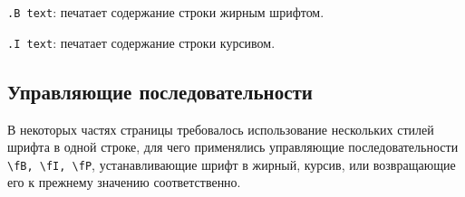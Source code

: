 \documentclass[listings]{labreport}
\begin{document}
\texttt{.B text}: печатает содержание строки жирным шрифтом.

\texttt{.I text}: печатает содержание строки курсивом.

\subsection*{Управляющие последовательности}

В некоторых частях страницы требовалось использование нескольких стилей шрифта в одной строке, для чего применялись
управляющие последовательности \texttt{\textbackslash fB, \textbackslash fI, \textbackslash fP},
устанавливающие шрифт в жирный, курсив, или возвращающие его к прежнему значению соответственно.
\end{document}
